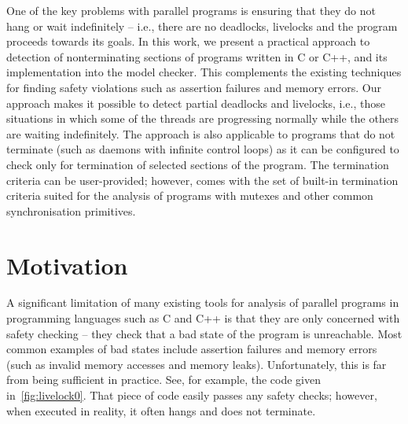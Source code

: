 
One of the key problems with parallel programs is ensuring that they do not hang or wait indefinitely -- i.e., there are no deadlocks, livelocks and the program proceeds towards its goals.
In this work, we present a practical approach to detection of nonterminating sections of programs written in C or C++, and its implementation into the \divine model checker.
This complements the existing techniques for finding safety violations such as assertion failures and memory errors.
Our approach makes it possible to detect partial deadlocks and livelocks, i.e., those situations in which some of the threads are progressing normally while the others are waiting indefinitely.
The approach is also applicable to programs that do not terminate (such as daemons with infinite control loops) as it can be configured to check only for termination of selected sections of the program.
The termination criteria can be user-provided; however, \divine comes with the set of built-in termination criteria suited for the analysis of programs with mutexes and other common synchronisation primitives.

\section{Motivation}

A significant limitation of many existing tools for analysis of parallel
programs in programming languages such as C and C++ is that they are only concerned with safety checking -- they check that a bad state of the program is unreachable.
Most common examples of bad states include assertion failures and memory errors (such as invalid memory accesses and memory leaks).
Unfortunately, this is far from being sufficient in practice.
See, for example, the code given in~\autoref{fig:livelock0}.
That piece of code easily passes any safety checks; however, when executed in reality, it often hangs and does not terminate.


